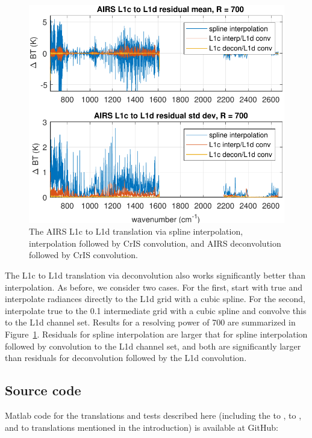 \documentclass[journal]{IEEEtran}
\begin{document}
\begin{figure} %
  \centering
  \includegraphics[width=\linewidth]{figures/CtoD_interp_diff.pdf}
  \caption{The AIRS L1c to L1d translation via spline interpolation,
    interpolation followed by CrIS convolution, and AIRS
    deconvolution followed by CrIS convolution.}
  \label{interpL1d}
\end{figure}

The {\airs} L1c to L1d translation via deconvolution also works
significantly better than interpolation.  As before, we consider 
two cases.  For the first, start with true {\airs} and interpolate
radiances directly to the L1d grid with a cubic spline.  For the
second, interpolate true {\airs} to the 0.1 {\wn} intermediate grid
with a cubic spline and convolve this to the L1d channel set.
Results for a resolving power of 700 are summarized in
Figure~\ref{interpL1d}.  Residuals for spline interpolation are
larger that for spline interpolation followed by convolution to the
L1d channel set, and both are significantly larger than residuals
for {\airs} deconvolution followed by the L1d convolution.

\subsection{Source code}

Matlab code for the translations and tests described here (including
the {\iasi} to {\cris}, {\iasi} to {\airs}, and {\cris} to {\airs}
translations mentioned in the introduction) is available at GitHub:
\end{document}
